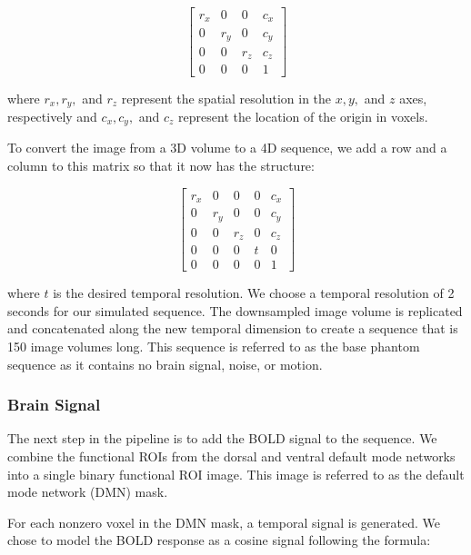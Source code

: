 \begin{equation}
\begin{bmatrix}
 r_x &  0   &  0   & c_x\\ 
 0   &  r_y &  0   & c_y \\ 
 0   &  0   &  r_z & c_z \\ 
 0   &  0   &  0   & 1 
\end{bmatrix}
\end{equation}

\noindent where $r_x, r_y,$ and $r_z$ represent the spatial resolution in the $x, y,$ and $z$ axes, respectively and $c_x, c_y,$ and $c_z$ represent the location of the origin in voxels. 

\clearpage 

To convert the image from a 3D volume to a 4D sequence, we add a row and a column to this matrix so that it now has the structure:

\begin{equation}
\begin{bmatrix}
 r_x &  0   &  0   & 0 & c_x\\ 
 0   &  r_y &  0   & 0 & c_y \\ 
 0   &  0   &  r_z & 0 & c_z \\ 
 0   &  0   &  0   & t & 0 \\
 0   &  0   &  0   & 0 & 1 
\end{bmatrix}
\end{equation}

\noindent where $t$ is the desired temporal resolution. We choose a temporal resolution of 2 seconds for our simulated sequence. The downsampled image volume is replicated and concatenated along the new temporal dimension to create a sequence that is 150 image volumes long. This sequence is referred to as the base phantom sequence as it contains no brain signal, noise, or motion.

\subsubsection{Brain Signal}

The next step in the pipeline is to add the BOLD signal to the sequence. 
We combine the functional ROIs from the dorsal and ventral default mode networks into a single binary functional ROI image. This image is referred to as the default mode network (DMN) mask. 

For each nonzero voxel in the DMN mask, a temporal signal is generated. We chose to model the BOLD response as a cosine signal following the formula:

